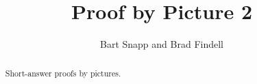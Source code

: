 \documentclass[nooutcomes]{ximera}
\title{Proof by Picture 2}
\author{Bart Snapp and Brad Findell}
\begin{document}
\begin{abstract}
Short-answer proofs by pictures.
\end{abstract}
\maketitle


%
\end{document}
